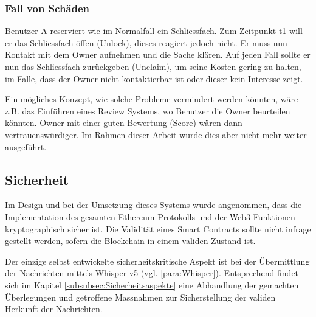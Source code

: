 \subsubsection{Fall von Schäden}
Benutzer A reserviert wie im Normalfall ein Schliessfach. Zum Zeitpunkt t1 will er das Schliessfach öffen (Unlock), dieses reagiert jedoch nicht. Er muss nun Kontakt mit dem Owner aufnehmen und die Sache klären. Auf jeden Fall sollte er nun das Schliessfach zurückgeben (Unclaim), um seine Kosten gering zu halten, im Falle, dass der Owner nicht kontaktierbar ist oder dieser kein Interesse zeigt.

Ein mögliches Konzept, wie solche Probleme vermindert werden könnten, wäre z.B. das Einführen eines Review Systems, wo Benutzer die Owner beurteilen könnten. Owner mit einer guten Bewertung (Score) wären dann vertrauenswürdiger. Im Rahmen dieser Arbeit wurde dies aber nicht mehr weiter ausgeführt. 

\subsection{Sicherheit}
Im Design und bei der Umsetzung dieses Systems wurde angenommen, dass die Implementation des gesamten Ethereum Protokolls und der Web3 Funktionen kryptographisch sicher ist. Die Validität eines Smart Contracts sollte nicht infrage gestellt werden, sofern die Blockchain in einem validen Zustand ist.\cite{github.com/ethereum/web3js, go-ethereum}

Der einzige selbst entwickelte sicherheitskritische Aspekt ist bei der Übermittlung der Nachrichten mittels Whisper v5 (vgl. \ref{para:Whisper}). Entsprechend findet sich im Kapitel \ref{subsubsec:Sicherheitsaspekte} eine Abhandlung der gemachten Überlegungen und getroffene Massnahmen zur Sicherstellung der validen Herkunft der Nachrichten.
